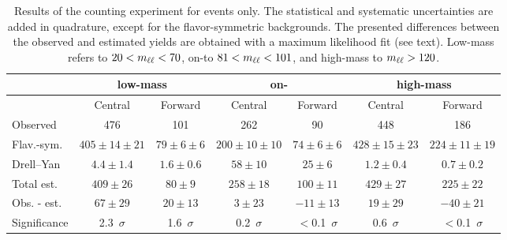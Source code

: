 
\begin{table}[hbtp]
 \renewcommand{\arraystretch}{1.3}
 \setlength{\belowcaptionskip}{6pt}
 \scriptsize
 \centering
 \caption{Results of the counting experiment for \MM events only.
     The statistical and systematic uncertainties are added in quadrature, except for the flavor-symmetric backgrounds. The presented differences between the observed and estimated yields are obtained with a maximum likelihood fit (see text).    Low-mass refers to $20 < m_{\ell\ell} < 70$\GeV, on-\Z to  $81 < m_{\ell\ell} < 101$\GeV, and high-mass to $m_{\ell\ell} > 120$\GeV.
     }
  \label{tab:METresults2012MM}
  \begin{tabular}{l| cc | cc | cc}

    							& \multicolumn{2}{c}{low-mass} & \multicolumn{2}{c}{on-\Z} & \multicolumn{2}{c}{high-mass} \\ 

    \hline
                                &  Central        & Forward  &  Central  & Forward   &  Central        & Forward \\ 

    \hline
        Observed       &  476                   & 101              &  262            &  90       &   448           &   186    \\

    \hline
        Flav.-sym.    & $405\pm14\pm21$        & $79\pm6\pm6$  &  $200\pm10\pm10$ & $74\pm6\pm6$ & $428\pm15\pm23$ & $224\pm11\pm19$ \\

            Drell--Yan          & $4.4\pm1.4$            & $1.6\pm0.6$      & $58\pm10$ & $25\pm6$ & $1.2\pm0.4$ & $0.7\pm0.2$ \\

    \hline
            Total est.          & $409\pm26$            & $80\pm9$      & $258\pm18$ & $100\pm11$ & $429\pm27$ & $225\pm22$ \\

    \hline
         Obs. - est.  & $67\pm29$      & $20\pm13$ & $3\pm23 $ & $-11\pm13$ & $19\pm29$ & $-40\pm21 $ \\ 

    \hline
   Significance      & 2.3~$\sigma$    &  1.6~$\sigma$  & 0.2~$\sigma$ & $<$0.1~$\sigma$ & 0.6~$\sigma$ & $<$0.1~$\sigma$ \\ 


  \end{tabular}
\end{table}


